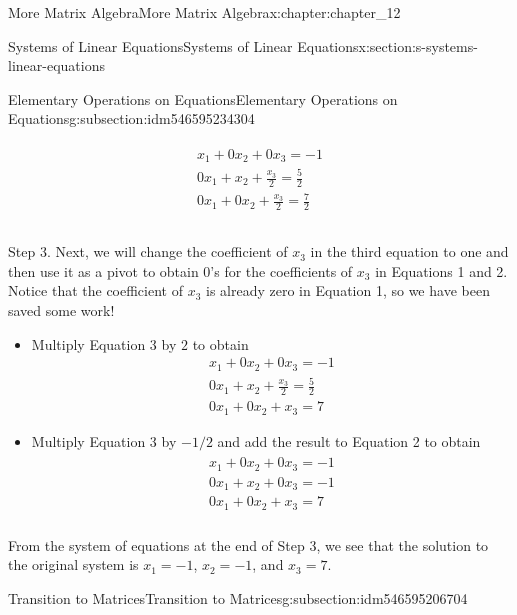 \documentclass[oneside,10pt,]{book}
\numberwithin{equation}{section}
\begin{document}
\begin{chapterptx}{More Matrix Algebra}{}{More Matrix Algebra}{}{}{x:chapter:chapter_12}
\begin{sectionptx}{Systems of Linear Equations}{}{Systems of Linear Equations}{}{}{x:section:s-systems-linear-equations}
\begin{subsectionptx}{Elementary Operations on Equations}{}{Elementary Operations on Equations}{}{}{g:subsection:idm546595234304}
\begin{itemize}[label=\textbullet]
\begin{gather}
\begin{array}{c}
x_1+ 0x_2 + 0x_3 = -1 \\
0 x_1+  x_2+ \frac{x_3}{2}=\frac{5}{2} \\
0 x_1 + 0 x_2+ \frac{x_3}{2}=\frac{7}{2} \\\\
\end{array}\label{g:mrow:idm546595213920}
\end{gather}
%
\end{itemize}
%
\par
Step 3. Next, we will change the coefficient of \(x_3\) in the third equation to one and then use it as a pivot to obtain 0's for the coefficients of \(x_3\) in Equations 1 and 2. Notice that the coefficient of \(x_3\) is already zero in Equation 1, so we have been saved some work!%
\begin{itemize}[label=\textbullet]
\item{}Multiply Equation 3 by \(2\) to obtain%
\begin{equation*}
\begin{array}{c}
x_1+ 0x_2 + 0x_3 = -1 \\
0 x_1+  x_2+ \frac{x_3}{2}=\frac{5}{2} \\
0 x_1 + 0 x_2+ x_3=7 
\end{array}
\end{equation*}
%
\item{}Multiply Equation 3 by \(-1/2\) and add the result to Equation 2 to obtain%
\begin{gather}
\begin{array}{c}
x_1+ 0x_2 + 0x_3 = -1 \\
0 x_1+  x_2+ 0 x_3=-1 \\
0 x_1 + 0 x_2+ x_3=7 \\
\end{array}\label{x:mrow:sys-12-1-final-system}
\end{gather}
%
\end{itemize}
%
\par
From the system of equations at the end of Step 3, we see that the solution to the original system is \(x_1=-1\), \(x_2= -1\), and \(x_3= 7\).%
\end{subsectionptx}
%
%
\typeout{************************************************}
\typeout{************************************************}
%
\begin{subsectionptx}{Transition to Matrices}{}{Transition to Matrices}{}{}{g:subsection:idm546595206704}

\end{subsectionptx}
\end{sectionptx}
\end{chapterptx}
\end{document}
